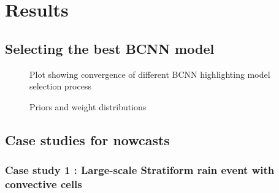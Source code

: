 \chapter{Results}
\label{chapter:results}

\section{Selecting the best BCNN model}

\begin{figure}[h]
	\label{fig:convergence-bcnn}
	\centering
	\caption{Plot showing convergence of different BCNN highlighting model selection process}
\end{figure}

\begin{figure}[ht]
	\label{fig:bcnn-candidates}
	\centering
	\caption{Priors and weight distributions}
\end{figure}

\section{Case studies for nowcasts}
\subsection{Case study 1 : Large-scale Stratiform rain event with convective cells}


